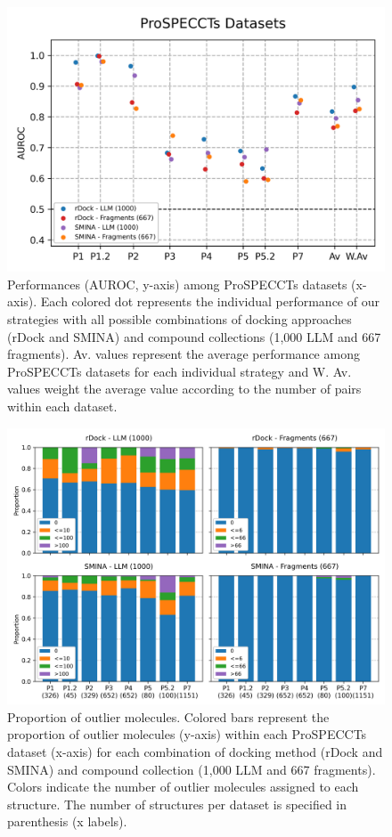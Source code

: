 \begin{figure}[htbp]
  \centering
  \includegraphics[width=0.65\linewidth]{figures/PocketVec/Supplementary/FigS4.png}
  \caption{
  Performances (AUROC, y-axis) among ProSPECCTs datasets (x-axis). Each colored dot represents the individual performance of our strategies with all possible combinations of docking approaches (rDock and SMINA) and compound collections (1,000 LLM and 667 fragments). Av. values represent the average performance among ProSPECCTs datasets for each individual strategy and W. Av. values weight the average value according to the number of pairs within each dataset.
  }
  \label{PocketVec_FigS4}
\end{figure}


\begin{figure}[htbp]
  \centering
  \includegraphics[width=0.75\linewidth]{figures/PocketVec/Supplementary/FigS5.png}
  \caption{
  Proportion of outlier molecules. Colored bars represent the proportion of outlier molecules (y-axis) within each ProSPECCTs dataset (x-axis) for each combination of docking method (rDock and SMINA) and compound collection (1,000 LLM and 667 fragments). Colors indicate the number of outlier molecules assigned to each structure. The number of structures per dataset is specified in parenthesis (x labels).
  }
  \label{PocketVec_FigS5}
\end{figure}

